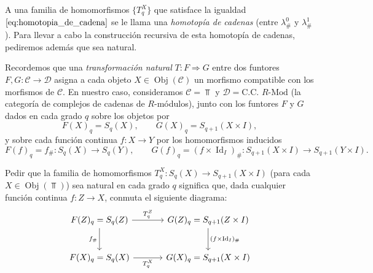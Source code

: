 \begin{dem}
\begin{definicion}
     A una familia de homomorfismos $\{T_q^X\}$ que satisface la igualdad $\ref{eq:homotopia_de_cadena}$ se le llama una \textit{homotopía de cadenas} (entre $\lambda^0_\#$ y $\lambda^1_\#$). Para llevar a cabo la construcción recursiva de esta homotopía de cadenas, pediremos además que sea natural.
\end{definicion}

Recordemos que una \textit{transformación natural} $T \colon F \Rightarrow G$ entre dos funtores $F, G \colon \mathcal{C} \to \mathcal{D}$ asigna a cada objeto $X \in \operatorname{Obj}(\mathcal{C})$ un morfismo compatible con los morfismos de $\mathcal{C}$. En nuestro caso, consideramos $\mathcal{C} = \Top$ y $\mathcal{D} = \text{C.C.\ } R\text{-Mod}$ (la categoría de complejos de cadenas de $R$-módulos), junto con los funtores $F$ y $G$ dados en cada grado $q$ sobre los objetos por
\[
F(X)_q = S_q(X), \qquad G(X)_q = S_{q+1}(X \times I),
\]
y sobre cada función continua $f \colon X \to Y$ por los homomorfismos inducidos
\[
F(f)_q = f_\# \colon S_q(X) \longrightarrow S_q(Y), \qquad G(f)_q = (f \times \operatorname{Id}_I)_\# \colon S_{q+1}(X \times I) \longrightarrow S_{q+1}(Y \times I).
\]

Pedir que la familia de homomorfismos $T_q^X \colon S_q(X) \to S_{q+1}(X \times I)$ (para cada $X \in \operatorname{Obj}(\Top)$) sea natural en cada grado $q$ significa que, dada cualquier función continua $f \colon Z \to X$, conmuta el siguiente diagrama:
\[
\begin{tikzcd}[column sep=3.4em, row sep=2.6em]
F(Z)_q = S_q(Z) \arrow[r, "T_q^Z"] \arrow[d, "f_\#"'] & G(Z)_q = S_{q+1}(Z \times I) \arrow[d, "(f \times \operatorname{Id}_I)_\#"] \\
F(X)_q = S_q(X) \arrow[r, "T_q^X"'] & G(X)_q = S_{q+1}(X \times I)
\end{tikzcd}
\]


\end{dem}
